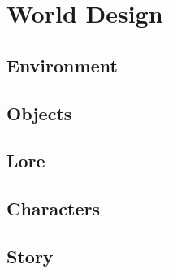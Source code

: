 \section{World Design}
\subsection{Environment}
\subsection{Objects}
\subsection{Lore}
\subsection{Characters}
\subsection{Story}

